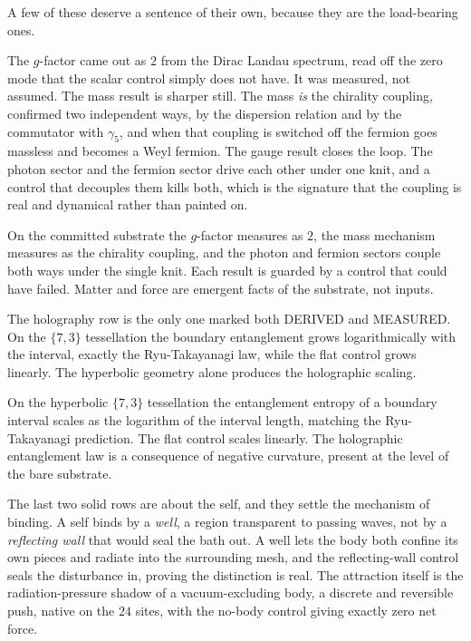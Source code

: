 A few of these deserve a sentence of their own, because they are the load-bearing ones.

The $g$-factor came out as $2$ from the Dirac Landau spectrum, read off the zero mode that the scalar control simply does not have. It was measured, not assumed. The mass result is sharper still. The mass \emph{is} the chirality coupling, confirmed two independent ways, by the dispersion relation and by the commutator with $\gamma_5$, and when that coupling is switched off the fermion goes massless and becomes a Weyl fermion. The gauge result closes the loop. The photon sector and the fermion sector drive each other under one knit, and a control that decouples them kills both, which is the signature that the coupling is real and dynamical rather than painted on.

\begin{result}
On the committed substrate the $g$-factor measures as $2$, the mass mechanism measures as the chirality coupling, and the photon and fermion sectors couple both ways under the single knit. Each result is guarded by a control that could have failed. Matter and force are emergent facts of the substrate, not inputs.
\end{result}

The holography row is the only one marked both DERIVED and MEASURED. On the $\{7,3\}$ tessellation the boundary entanglement grows logarithmically with the interval, exactly the Ryu-Takayanagi law, while the flat control grows linearly. The hyperbolic geometry alone produces the holographic scaling.

\begin{theorem}
On the hyperbolic $\{7,3\}$ tessellation the entanglement entropy of a boundary interval scales as the logarithm of the interval length, matching the Ryu-Takayanagi prediction. The flat control scales linearly. The holographic entanglement law is a consequence of negative curvature, present at the level of the bare substrate.
\end{theorem}

The last two solid rows are about the self, and they settle the mechanism of binding. A self binds by a \emph{well}, a region transparent to passing waves, not by a \emph{reflecting wall} that would seal the bath out. A well lets the body both confine its own pieces and radiate into the surrounding mesh, and the reflecting-wall control seals the disturbance in, proving the distinction is real. The attraction itself is the radiation-pressure shadow of a vacuum-excluding body, a discrete and reversible push, native on the $24$ sites, with the no-body control giving exactly zero net force.

